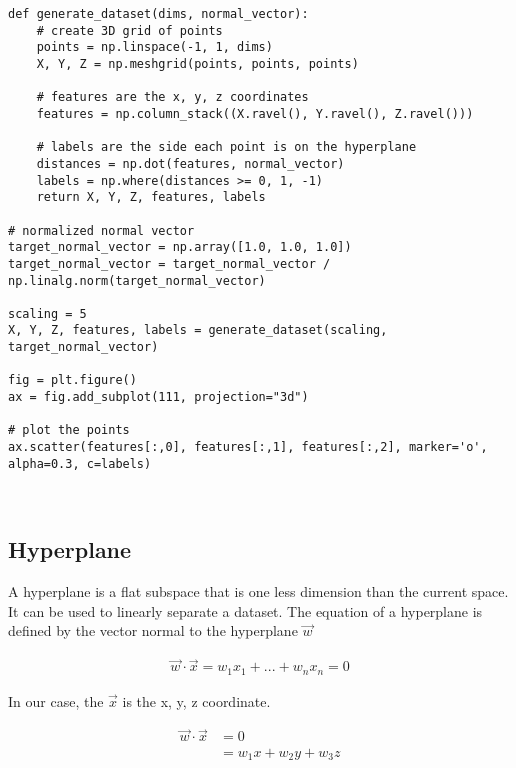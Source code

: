 \documentclass[openany]{book}
\begin{document}
\begin{tcolorbox}
\tiny
\begin{verbatim}
def generate_dataset(dims, normal_vector):
    # create 3D grid of points
    points = np.linspace(-1, 1, dims)
    X, Y, Z = np.meshgrid(points, points, points)

    # features are the x, y, z coordinates
    features = np.column_stack((X.ravel(), Y.ravel(), Z.ravel()))

    # labels are the side each point is on the hyperplane
    distances = np.dot(features, normal_vector)
    labels = np.where(distances >= 0, 1, -1)
    return X, Y, Z, features, labels

# normalized normal vector
target_normal_vector = np.array([1.0, 1.0, 1.0])
target_normal_vector = target_normal_vector / np.linalg.norm(target_normal_vector)

scaling = 5
X, Y, Z, features, labels = generate_dataset(scaling, target_normal_vector)

fig = plt.figure()
ax = fig.add_subplot(111, projection="3d")

# plot the points
ax.scatter(features[:,0], features[:,1], features[:,2], marker='o', alpha=0.3, c=labels)
\end{verbatim}
\end{tcolorbox}
        
    \begin{center}
    \end{center}
    { \hspace*{\fill} \\}
    
    \subsection{Hyperplane}\label{hyperplane}

A hyperplane is a flat subspace that is one less dimension than the
current space. It can be used to linearly separate a dataset. The
equation of a hyperplane is defined by the vector normal to the
hyperplane \(\vec{w}\)

\begin{align*}
\vec{w} \cdot \vec{x} = w_1 x_1 + ... + w_n x_n = 0
\end{align*}

In our case, the \(\vec{x}\) is the x, y, z coordinate.

\begin{align*}
\vec{w} \cdot \vec{x} &= 0 \\
&= w_1 x + w_2 y + w_3 z
\end{align*}
\end{document}
